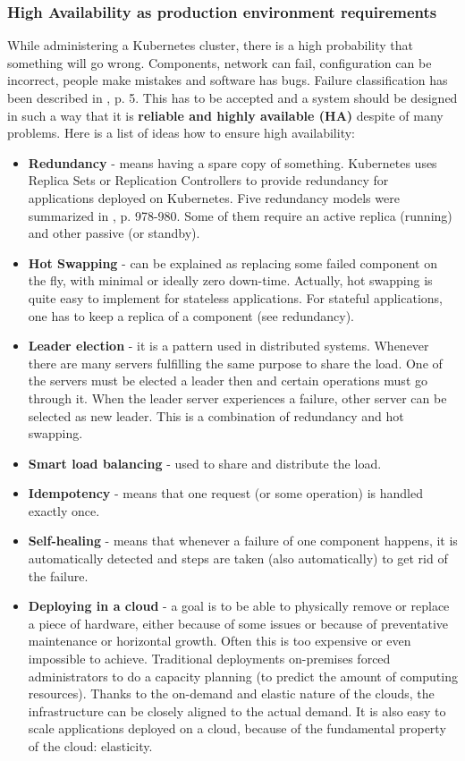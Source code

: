 \subsubsection{High Availability as production environment requirements}
While administering a Kubernetes cluster, there is a high probability that something will go wrong. Components, network can fail, configuration can be incorrect, people make mistakes and software has bugs. Failure classification has been described in \cite{article-failures}, p. 5. This has to be accepted and a system should be designed in such a way that it is \textbf{reliable and highly available (HA)} despite of many problems. Here is a list of ideas how to ensure high availability\cite{book-mastering-k8s}:
\begin{itemize}
\item \textbf{Redundancy} - means having a spare copy of something. Kubernetes uses Replica Sets or Replication Controllers to provide redundancy for applications deployed on Kubernetes. Five redundancy models were summarized in \cite{article-redundancy-models}, p. 978-980. Some of them require an active replica (running) and other passive (or standby).
\item \textbf{Hot Swapping} - can be explained as replacing some failed component on the fly, with minimal or ideally zero down-time. Actually, hot swapping is quite easy to implement for stateless applications. For stateful applications, one has to keep a replica of a component (see redundancy).
\item \textbf{Leader election} - it is a pattern used in distributed systems. Whenever there are many servers fulfilling the same purpose to share the load. One of the servers must be elected a leader then and certain operations must go through it. When the leader server experiences a failure, other server can be selected as new leader. This is a combination of redundancy and hot swapping.
\item \textbf{Smart load balancing} - used to share and distribute the load.
\item \textbf{Idempotency} - means that one request (or some operation) is handled exactly once.
\item \textbf{Self-healing} - means that whenever a failure of one component happens, it is automatically detected and steps are taken (also automatically) to get rid of the failure.
\item \textbf{Deploying in a cloud} - a goal is to be able to physically remove or replace a piece of hardware, either because of some issues or because of preventative maintenance or horizontal growth. Often this is too expensive or even impossible to achieve\cite{article-failures}. Traditional deployments on-premises forced administrators to do a capacity planning (to predict the amount of computing resources). Thanks to the on-demand and elastic nature of the clouds, the infrastructure can be closely aligned to the actual demand. It is also easy to scale applications deployed on a cloud, because of the fundamental property of the cloud: elasticity\cite{article-aws-architecting}.
\end{itemize}

